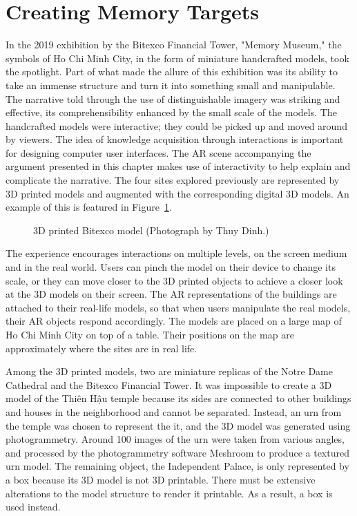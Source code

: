 \section{Creating Memory Targets}
In the 2019 exhibition by the Bitexco Financial Tower, "Memory Museum," the symbols of Ho Chi Minh City, in the form of miniature handcrafted models, took the spotlight. Part of what made the allure of this exhibition was its ability to take an immense structure and turn it into something small and manipulable. The narrative told through the use of distinguishable imagery was striking and effective, its comprehensibility enhanced by the small scale of the models. The handcrafted models were interactive; they could be picked up and moved around by viewers. The idea of knowledge acquisition through interactions is important for designing computer user interfaces. The AR scene accompanying the argument presented in this chapter makes use of interactivity to help explain and complicate the narrative. The four sites explored previously are represented by 3D printed models and augmented with the corresponding digital 3D models. An example of this is featured in Figure~\ref{bitexco_model}.

\begin{figure}[!ht]
\begin{center}
\vspace{-.2 in}
\caption[3D printed Bitexco model]{\vi 3D printed Bitexco model (Photograph by Thuy Dinh.)}\label{bitexco_model}
\end{center}
\vspace{-.3 in}
\end{figure}

The experience encourages interactions on multiple levels, on the screen medium and in the real world. Users can pinch the model on their device to change its scale, or they can move closer to the 3D printed objects to achieve a closer look at the 3D models on their screen. The AR representations of the buildings are attached to their real-life models, so that when users manipulate the real models, their AR objects respond accordingly. The models are placed on a large map of Ho Chi Minh City on top of a table. Their positions on the map are approximately where the sites are in real life.

Among the 3D printed models, two are miniature replicas of the Notre Dame Cathedral and the Bitexco Financial Tower. It was impossible to create a 3D model of the Thiên Hậu temple because its sides are connected to other buildings and houses in the neighborhood and cannot be separated. Instead, an urn from the temple was chosen to represent the it, and the 3D model was generated using photogrammetry. Around 100 images of the urn were taken from various angles, and processed by the photogrammetry software Meshroom to produce a textured urn model. The remaining object, the Independent Palace, is only represented by a box because its 3D model is not 3D printable. There must be extensive alterations to the model structure to render it printable. As a result, a box is used instead.


